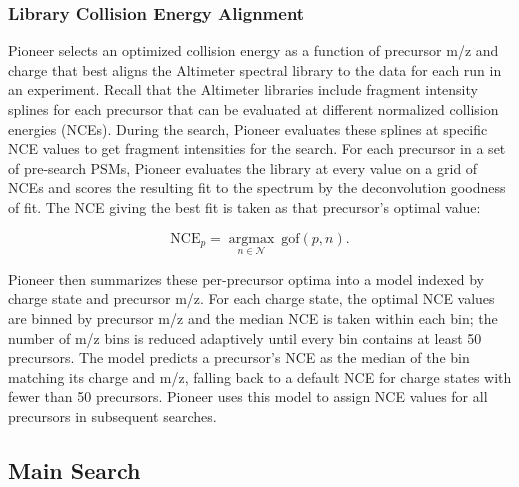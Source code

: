 \documentclass[pdflatex,sn-nature]{sn-jnl}
\begin{document}
\subsubsection{Library Collision Energy Alignment}\label{subsubsec:library-collision-energy-alignment}

Pioneer selects an optimized collision energy as a function of precursor m/z and charge that best aligns the Altimeter spectral library to the data for each run in an experiment. Recall that the Altimeter libraries include fragment intensity splines for each precursor that can be evaluated at different normalized collision energies (NCEs). During the search, Pioneer evaluates these splines at specific NCE values to get fragment intensities for the search. For each precursor in a set of pre-search PSMs, Pioneer evaluates the library at every value on a grid of NCEs and scores the resulting fit to the spectrum by the deconvolution goodness of fit. The NCE giving the best fit is taken as that precursor's optimal value:

\begin{equation}
    \text{NCE}_p = \underset{n \in \mathcal{N}}{\operatorname{argmax}}\ \text{gof}(p, n).
\end{equation}

Pioneer then summarizes these per-precursor optima into a model indexed by charge state and precursor m/z. For each charge state, the optimal NCE values are binned by precursor m/z and the median NCE is taken within each bin; the number of m/z bins is reduced adaptively until every bin contains at least 50 precursors. The model predicts a precursor's NCE as the median of the bin matching its charge and m/z, falling back to a default NCE for charge states with fewer than 50 precursors. Pioneer uses this model to assign NCE values for all precursors in subsequent searches.

\subsection{Main Search}\label{subsec:first-pass-search}
\end{document}
